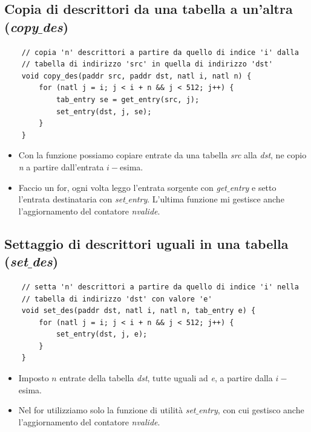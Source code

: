 \subsection{Copia di descrittori da una tabella a un'altra (\emph{copy$\_$des})}
\small 
\begin{verbatim}
	// copia 'n' descrittori a partire da quello di indice 'i' dalla
	// tabella di indirizzo 'src' in quella di indirizzo 'dst'
	void copy_des(paddr src, paddr dst, natl i, natl n) {
		for (natl j = i; j < i + n && j < 512; j++) {
			tab_entry se = get_entry(src, j);
			set_entry(dst, j, se);
		}
	}
\end{verbatim}
\normalsize 
\begin{itemize}
	\item Con la funzione possiamo copiare entrate da una tabella \emph{src} alla \emph{dst}, ne copio \emph{n} a partire dall'entrata $i-$esima.
	\item Faccio un for, ogni volta leggo l'entrata sorgente con \emph{get$\_$entry} e setto l'entrata destinataria con \emph{set$\_$entry}. L'ultima funzione mi gestisce anche l'aggiornamento del contatore \emph{nvalide}.
\end{itemize}
\subsection{Settaggio di descrittori uguali in una tabella (\emph{set$\_$des})}
\small 
\begin{verbatim}
	// setta 'n' descrittori a partire da quello di indice 'i' nella
	// tabella di indirizzo 'dst' con valore 'e'
	void set_des(paddr dst, natl i, natl n, tab_entry e) {
		for (natl j = i; j < i + n && j < 512; j++) {
			set_entry(dst, j, e);
		}
	}
\end{verbatim}
\normalsize 
\begin{itemize}
	\item Imposto $n$ entrate della tabella \emph{dst}, tutte uguali ad \emph{e}, a partire dalla $i-$esima.
	\item Nel for utilizziamo solo la funzione di utilità \emph{set$\_$entry}, con cui gestisco anche l'aggiornamento del contatore \emph{nvalide}.
\end{itemize}
\clearpage 

